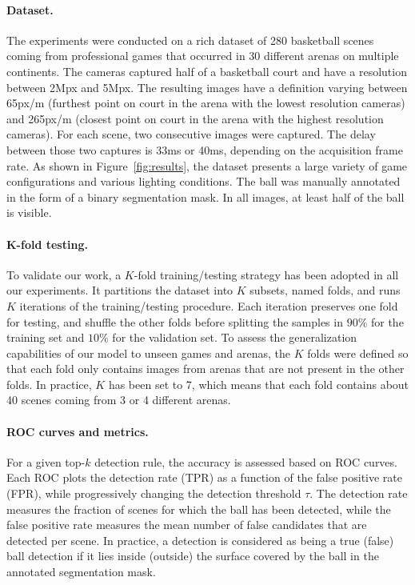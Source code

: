 \documentclass[sigconf, screen]{acmart}
\begin{document}
\paragraph{Dataset.}
\label{sec:dataset}
The experiments were conducted on a rich dataset of 280 basketball scenes coming from professional games that occurred in 30 different arenas on multiple continents. The cameras captured half of a basketball court and have a resolution between 2Mpx and 5Mpx. The resulting images have a definition varying between 65px/m (furthest point on court in the arena with the lowest resolution cameras) and 265px/m (closest point on court in the arena with the highest resolution cameras). For each scene, two consecutive images were captured. The delay between those two captures is 33ms or 40ms, depending on the acquisition frame rate. As shown in Figure~\ref{fig:results}, the dataset presents a large variety of game configurations and various lighting conditions. The ball was manually annotated in the form of a binary segmentation mask. In all images, at least half of the ball is visible.

\paragraph{K-fold testing.}
To validate our work, a $K$-fold training/testing strategy has been adopted in all our experiments. It partitions the dataset into $K$ subsets, named folds, and runs $K$ iterations of the training/testing procedure. Each iteration preserves one fold for testing, and shuffle the other folds before splitting the samples in $90\%$ for the training set and $10\%$ for the validation set.
To assess the generalization capabilities of our model to unseen games and arenas, the $K$ folds were defined so that each fold only contains images from arenas that are not present in the other folds.
In practice, $K$ has been set to 7, which means that each fold contains about 40 scenes coming from 3 or 4 different arenas.

\paragraph{ROC curves and metrics.}
For a given top-$k$ detection rule, the accuracy is assessed based on ROC curves. Each ROC plots the detection rate (TPR) as a function of the false positive rate (FPR), while progressively changing the detection threshold $\tau$. The detection rate measures the fraction of scenes for which the ball has been detected, while the false positive rate measures the mean number of false candidates that are detected per scene. In practice, a detection is considered as being a true (false) ball detection if it lies inside (outside) the surface covered by the ball in the annotated segmentation mask.
\end{document}
